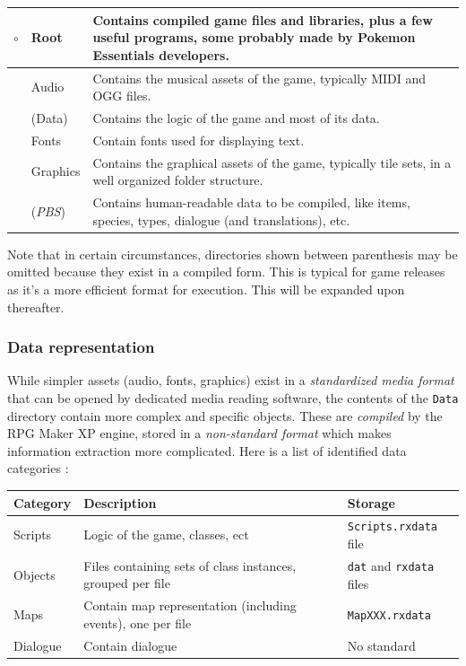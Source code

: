 \documentclass[11pt]{article}
\begin{document}
{\begin{tabular}{|r L{.1\linewidth}|L{.8\linewidth}|}
	\hline
	$\circ$ & Root & Contains compiled game files and libraries, plus a few useful programs, some probably made by Pokemon Essentials developers. \\
	\hline
	 & Audio & Contains the musical assets of the game, typically MIDI and OGG files. \\
	\hline
	 & (Data) & Contains the logic of the game and most of its data.  \\
	\hline
	 & Fonts & Contain fonts used for displaying text. \\
	\hline
	 & Graphics & Contains the graphical assets of the game, typically tile sets, in a well organized folder structure. \\
	\hline
	 & (\textit{PBS}) & Contains human-readable data to be compiled, like items, species, types, dialogue (and translations), etc. \\
	\hline
\end{tabular}

Note that in certain circumstances, directories shown between parenthesis may be omitted because they exist in a compiled form. This is typical for game releases as it's a more efficient format for execution. This will be expanded upon thereafter.


\subsubsection{Data representation}

While simpler assets (audio, fonts, graphics) exist in a \textit{standardized media format} that can be opened by dedicated media reading software, the contents of the \verb|Data| directory contain more complex and specific objects. These are \textit{compiled} by the RPG Maker XP engine, stored in a \textit{non-standard format} which makes information extraction more complicated. Here is a list of identified data categories :

{\small
\begin{tabular}{|L{.1\textwidth}|L{.56\textwidth}|L{.26\textwidth}|}
	\hline
	\textbf{Category} & \textbf{Description} & \textbf{Storage} \\
	\hline
	Scripts & Logic of the game, classes, ect & \verb|Scripts.rxdata| file \\
	\hline
	Objects & Files containing sets of class instances, grouped per file & \verb|dat| and \verb|rxdata| files \\
	\hline
	Maps & Contain map representation (including events), one per file & \verb|MapXXX.rxdata| \\
	\hline
	Dialogue & Contain dialogue & No standard \\
	\hline
\end{tabular}}

}
\end{document}
